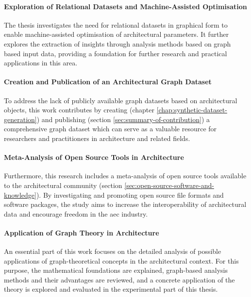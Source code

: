 \documentclass[a4paper, 12pt]{report}
\begin{document}
\paragraph{Exploration of Relational Datasets and Machine-Assisted Optimisation}

The thesis investigates the need for relational datasets in graphical form to enable machine-assisted optimisation of architectural parameters. It further explores the extraction of insights through analysis methods based on graph based input data, providing a foundation for further research and practical applications in this area.

\paragraph{Creation and Publication of an Architectural Graph Dataset}

To address the lack of publicly available graph datasets based on architectural objects, this work contributes by creating (chapter \ref{chap:synthetic-dataset-generation}) and publishing (section \ref{sec:summary-of-contribution}) a comprehensive graph dataset which can serve as a valuable resource for researchers and practitioners in architecture and related fields.

\paragraph{Meta-Analysis of Open Source Tools in Architecture}

Furthermore, this research includes a meta-analysis of \gls{open source} tools available to the architectural community (section \ref{sec:open-source-software-and-knowledge}). By investigating and promoting \gls{open source} file formats and software packages, the study aims to increase the interoperability of architectural data and encourage freedom in the \acrshort{aec} industry.

\paragraph{Application of Graph Theory in Architecture}

An essential part of this work focuses on the detailed analysis of possible applications of graph-theoretical concepts in the architectural context. For this purpose, the mathematical foundations are explained, graph-based analysis methods and their advantages are reviewed, and a concrete application of the theory is explored and evaluated in the experimental part of this thesis.
\end{document}
